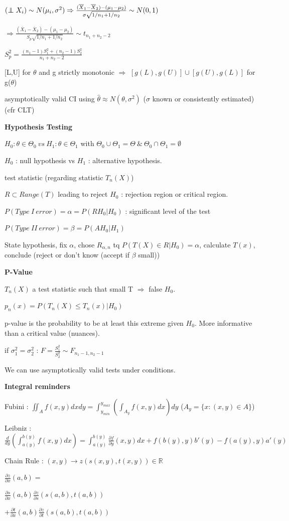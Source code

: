 \documentclass[a4paper,10.5pt]{article}
\newcommand\independent{\protect\mathpalette{\protect\independenT}{\perp}}
\def\independenT#1#2{\mathrel{\rlap{$#1#2$}\mkern2mu{#1#2}}}
\begin{document}
\begin{multicols}{4}
		$(\independent X_i) \sim N(\mu_i,\sigma^2) \Rightarrow \frac{(\overline{X}_1-\overline{X}_2)-(\mu_1-\mu_2)}{\sigma\sqrt{1/n_1+1/n_2}}\sim N(0,1)$
		
		$\Rightarrow \frac{(\overline{X}_1-\overline{X}_2)-(\mu_1-\mu_2)}{S_p\sqrt{1/n_1+1/n_2}}\sim t_{n_1+n_2-2}$
		
		$S_p^2 = \frac{(n_1-1)S_1^2+(n_2-1)S_2^2}{n_1+n_2-2}$
		
		[L,U] for $\theta$ and g strictly monotonic $\Rightarrow$ $[g(L),g(U)] \cup [g(U),g(L)]$  for g($\theta$)
		
		asymptotically valid CI using $\hat{\theta} \approx N(\theta,\sigma^2)$ ($\sigma$ known or consistently estimated) (cfr CLT)
		
		\textbf{Hypothesis Testing}
		
		$H_0 : \theta \in \Theta_0\ vs\ H_1 : \theta\in\Theta_1$ with $\Theta_0\cup\Theta_1 = \Theta \ \&\ \Theta_0\cap\Theta_1 = \emptyset$
		
		$H_0$ : null hypothesis vs $H_1$ : alternative hypothesis.
		
		test statistic (regarding statistic $T_n(X)$)
		
		$R \subset Range(T)$ leading to reject $H_0$ : rejection region or critical region.
		
		$P(Type\ I\ error) = \alpha = P(RH_0|H_0)$ : significant level of the test
		
		$P(Type\ II\ error) = \beta = P(AH_0|H_1)$
		
		State hypothesis, fix $\alpha$, chose $R_{\alpha,n}$ tq $P(T(X)\in R|H_0) = \alpha$, calculate $T(x)$, conclude (reject or don't know (accept if $\beta$ small))
		
		\textbf{P-Value}
		
		$T_n(X)$ a test statistic such that small T $\Rightarrow$ false $H_0$.
		
		$p_n(x) = P(T_n(X) \leq T_n(x)|H_0)$
		
		p-value is the probability to be at least this extreme given $H_0$. More informative than a critical value (nuances).
		
		if $\sigma_1^2 = \sigma_2^2$ : $F = \frac{S_1^2}{S_2^2}\sim F_{n_1-1,n_2-1}$
		
		We can use asymptotically valid tests under conditions.
		
		\textbf{Integral reminders}
		
		Fubini : $\iint_A f(x,y)dxdy = \int_{y_{min}}^{y_{max}}\left(\int_{A_y}f(x,y)dx\right)dy$ ($A_y = \{x : (x,y)\in A\}$)
		
		Leibniz : $\frac{d}{dy}\left(\int_{a(y)}^{b(y)}f(x,y)dx\right) = \int_{a(y)}^{b(y)}\frac{\partial f}{\partial y}(x,y)dx + f(b(y),y)b'(y) - f(a(y),y)a'(y)$
		
		Chain Rule : $(x,y)\to z(s(x,y),t(x,y))\in\mathbb{R}$
		
		$\frac{\partial z}{\partial x}(a,b) =$
		
		$\frac{\partial s}{\partial x}(a,b)\frac{\partial z}{\partial s}(s(a,b),t(a,b))$
		
		$+ \frac{\partial t}{\partial x}(a,b)\frac{\partial z}{\partial t}(s(a,b),t(a,b))$
		
	\end{multicols}
	
	
	
\end{document}
